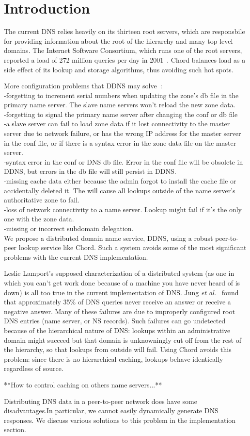 \section{Introduction}

The current DNS relies heavily on its
thirteen root servers, which are responsbile for providing
information about the root of the hierarchy and many top-level domains.
The Internet Software Consortium, which runs one of the root servers,
reported a load of 272 million queries per day in 2001~\cite{isc-root}.
Chord balances load as a side effect of its lookup and storage 
algorithms, thus avoiding such hot spots.

More configuration problems that DDNS may solve~\cite{dns-bind}:\\
-forgetting to increment serial numbers when updating the zone's db file 
in the primary name server. The slave name servers won't reload
the new zone data.\\
-forgetting to signal the primary name server after changing the conf or db file\\
-a slave server can fail to load zone data if it lost connectivity to 
the master server due to network failure, or has the wrong IP address for
the master server in the conf file, or if there is a syntax error in 
the zone data file on the master server.\\
-syntax error in the conf or DNS db file. Error in the conf file will 
be obsolete in DDNS, but errors in the db file will still persist in DDNS.\\
-missing cache data either because the admin forgot to install the 
cache file or accidentally deleted it. The will cause all lookups outside 
of the name server's authoritative zone to fail.\\
-loss of network connectivity to a name server. Lookup might fail if it's
the only one with the zone data.\\
-missing or incorrect subdomain delegation.\\

We propose a distributed domain name service, DDNS,
using a robust peer-to-peer lookup service like Chord.
Such a system avoids some of the most significant
problems with the current DNS implementation.
 
Leslie Lamport's supposed characterization of a
distributed system (as one in which you can't get work
done because of a machine you have never heard of is down)
is all too true in the current implementation of {DNS}.
Jung {\it et al.}~\cite{dnscache:sigcommimw01} found that approximately
35\% of DNS queries never receive an answer or receive
a negative answer.
Many of these failures are due to improperly configured
root DNS entries (name server, or NS records).
Such failures can go undetected because of the hierarchical
nature of DNS: lookups within an administrative domain might
succeed but that domain is unknowningly cut off from the rest
of the hierarchy, so that lookups from outside will fail.
Using Chord avoids this problem: since there is no hierarchical
caching, lookups behave identically regardless of source.

**How to control caching on others name servers...**

Distributing DNS data in a peer-to-peer network does have some
disadvantages.In particular, we cannot easily dynamically 
generate DNS responses. We discuss various solutions to 
this problem in the implementation section.



